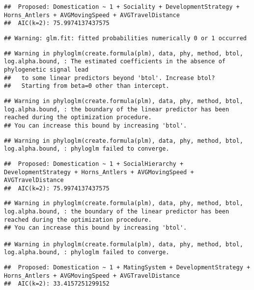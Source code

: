 \documentclass[
]{article}
\begin{document}
\begin{verbatim}
##  Proposed: Domestication ~ 1 + Sociality + DevelopmentStrategy + Horns_Antlers + AVGMovingSpeed + AVGTravelDistance
##  AIC(k=2): 75.9974137437575
\end{verbatim}

\begin{verbatim}
## Warning: glm.fit: fitted probabilities numerically 0 or 1 occurred
\end{verbatim}

\begin{verbatim}
## Warning in phyloglm(create.formula(plm), data, phy, method, btol, log.alpha.bound, : The estimated coefficients in the absence of phylogenetic signal lead
##   to some linear predictors beyond 'btol'. Increase btol?
##   Starting from beta=0 other than intercept.
\end{verbatim}

\begin{verbatim}
## Warning in phyloglm(create.formula(plm), data, phy, method, btol, log.alpha.bound, : the boundary of the linear predictor has been reached during the optimization procedure.
## You can increase this bound by increasing 'btol'.
\end{verbatim}

\begin{verbatim}
## Warning in phyloglm(create.formula(plm), data, phy, method, btol, log.alpha.bound, : phyloglm failed to converge.
\end{verbatim}

\begin{verbatim}
##  Proposed: Domestication ~ 1 + SocialHierarchy + DevelopmentStrategy + Horns_Antlers + AVGMovingSpeed + AVGTravelDistance
##  AIC(k=2): 75.9974137437575
\end{verbatim}

\begin{verbatim}
## Warning in phyloglm(create.formula(plm), data, phy, method, btol, log.alpha.bound, : the boundary of the linear predictor has been reached during the optimization procedure.
## You can increase this bound by increasing 'btol'.

## Warning in phyloglm(create.formula(plm), data, phy, method, btol, log.alpha.bound, : phyloglm failed to converge.
\end{verbatim}

\begin{verbatim}
##  Proposed: Domestication ~ 1 + MatingSystem + DevelopmentStrategy + Horns_Antlers + AVGMovingSpeed + AVGTravelDistance
##  AIC(k=2): 33.4157251299152
\end{verbatim}
\end{document}

